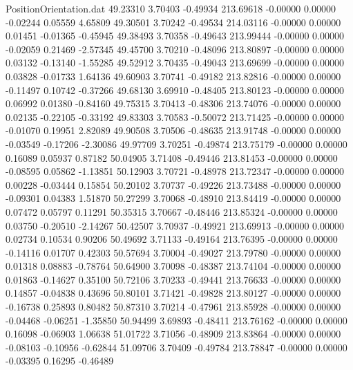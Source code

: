 \begin{filecontents}{PositionOrientation.dat}
  49.23310    3.70403   -0.49934   213.69618   -0.00000    0.00000   -0.02244    0.05559    4.65809
  49.30501    3.70242   -0.49534   214.03116   -0.00000    0.00000    0.01451   -0.01365   -0.45945
  49.38493    3.70358   -0.49643   213.99444   -0.00000    0.00000   -0.02059    0.21469   -2.57345
  49.45700    3.70210   -0.48096   213.80897   -0.00000    0.00000    0.03132   -0.13140   -1.55285
  49.52912    3.70435   -0.49043   213.69699   -0.00000    0.00000    0.03828   -0.01733    1.64136
  49.60903    3.70741   -0.49182   213.82816   -0.00000    0.00000   -0.11497    0.10742   -0.37266
  49.68130    3.69910   -0.48405   213.80123   -0.00000    0.00000    0.06992    0.01380   -0.84160
  49.75315    3.70413   -0.48306   213.74076   -0.00000    0.00000    0.02135   -0.22105   -0.33192
  49.83303    3.70583   -0.50072   213.71425   -0.00000    0.00000   -0.01070    0.19951    2.82089
  49.90508    3.70506   -0.48635   213.91748   -0.00000    0.00000   -0.03549   -0.17206   -2.30086
  49.97709    3.70251   -0.49874   213.75179   -0.00000    0.00000    0.16089    0.05937    0.87182
  50.04905    3.71408   -0.49446   213.81453   -0.00000    0.00000   -0.08595    0.05862   -1.13851
  50.12903    3.70721   -0.48978   213.72347   -0.00000    0.00000    0.00228   -0.03444    0.15854
  50.20102    3.70737   -0.49226   213.73488   -0.00000    0.00000   -0.09301    0.04383    1.51870
  50.27299    3.70068   -0.48910   213.84419   -0.00000    0.00000    0.07472    0.05797    0.11291
  50.35315    3.70667   -0.48446   213.85324   -0.00000    0.00000    0.03750   -0.20510   -2.14267
  50.42507    3.70937   -0.49921   213.69913   -0.00000    0.00000    0.02734    0.10534    0.90206
  50.49692    3.71133   -0.49164   213.76395   -0.00000    0.00000   -0.14116    0.01707    0.42303
  50.57694    3.70004   -0.49027   213.79780   -0.00000    0.00000    0.01318    0.08883   -0.78764
  50.64900    3.70098   -0.48387   213.74104   -0.00000    0.00000    0.01863   -0.14627    0.35100
  50.72106    3.70233   -0.49441   213.76633   -0.00000    0.00000    0.14857   -0.04838    0.43696
  50.80101    3.71421   -0.49828   213.80127   -0.00000    0.00000   -0.16738    0.25893    0.80482
  50.87310    3.70214   -0.47961   213.85928   -0.00000    0.00000   -0.04468   -0.06251   -1.35850
  50.94499    3.69893   -0.48411   213.76162   -0.00000    0.00000    0.16098   -0.06903    1.06638
  51.01722    3.71056   -0.48909   213.83864   -0.00000    0.00000   -0.08103   -0.10956   -0.62844
  51.09706    3.70409   -0.49784   213.78847   -0.00000    0.00000   -0.03395    0.16295   -0.46489

\end{filecontents}
